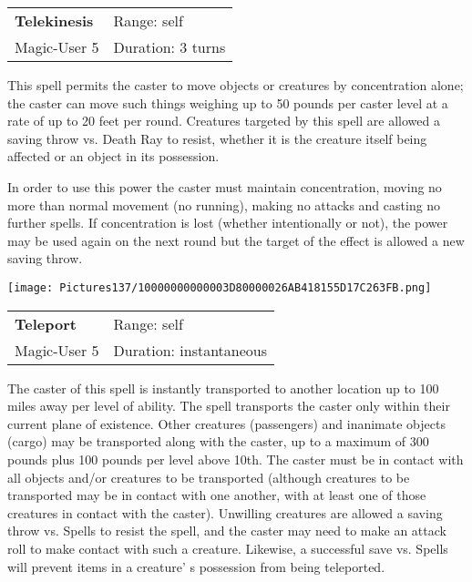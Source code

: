 \documentclass[a4paper,twoside,openany,10pt]{book}
\begin{document}
\begin{multicols}{2}
\smallskip\begin{flushleft} 
	\begin{tabularx}{0.45\textwidth}{@{}m{3.5cm}m{5.5cm}@{}} 
		\textbf{Telekinesis} & Range: self\\
Magic-User 5 &Duration: 3 turns\\
	\end{tabularx}\end{flushleft}

This spell permits the caster to move objects or creatures by concentration alone; the caster can move such things weighing up to 50 pounds per caster level at a rate of up to 20 feet per round. Creatures targeted by this spell are allowed a saving throw vs. Death Ray to resist, whether it is the creature itself being affected or an object in its possession.

In order to use this power the caster must maintain concentration, moving no more than normal movement (no running), making no attacks and casting no further spells. If concentration is lost (whether intentionally or not), the power may be used again on the next round but the target of the effect is allowed a new saving throw.

\medskip

\begin{flushleft}
	\texttt{[image: Pictures137/10000000000003D80000026AB418155D17C263FB.png]}
\end{flushleft}

\smallskip\begin{flushleft} 
	\begin{tabularx}{0.45\textwidth}{@{}m{3.5cm}m{5.5cm}@{}} 
		\textbf{Teleport} & Range: self\\
Magic-User 5 &Duration: instantaneous\\
	\end{tabularx}\end{flushleft}

The caster of this spell is instantly transported to another location up to 100 miles away per level of ability. The spell transports the caster only within their current plane of existence. Other creatures (passengers) and inanimate objects (cargo) may be transported along with the caster, up to a maximum of 300 pounds plus 100 pounds per level above 10th. The caster must be in contact with all objects and/or creatures to be transported (although creatures to be transported may be in contact with one another, with at least one of those creatures in contact with the caster). Unwilling creatures are allowed a saving throw vs. Spells to resist the spell, and the caster may need to make an attack roll to make contact with such a creature. Likewise, a successful save vs. Spells will prevent items in a creature' s possession from being teleported.


\end{multicols}
\end{document}
